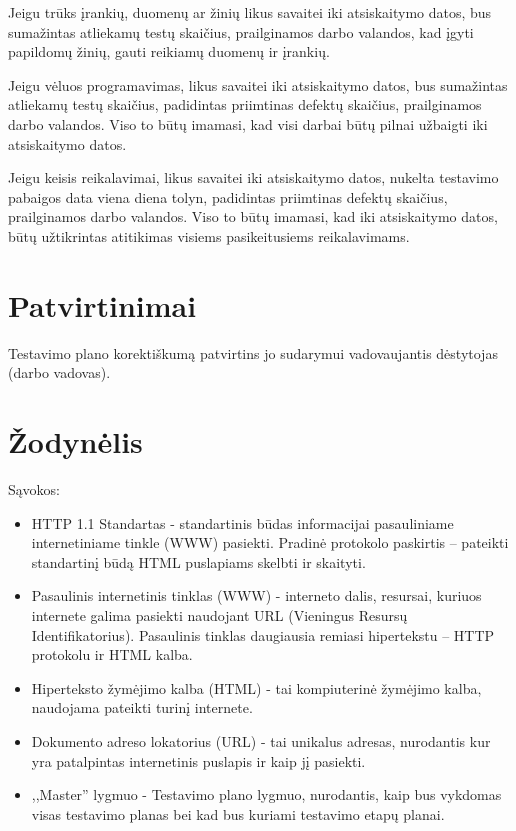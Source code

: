 Jeigu trūks įrankių, duomenų ar žinių likus savaitei iki atsiskaitymo datos, bus sumažintas atliekamų testų skaičius, prailginamos darbo valandos, kad įgyti papildomų žinių, gauti reikiamų duomenų ir įrankių.

Jeigu vėluos programavimas, likus savaitei iki atsiskaitymo datos, bus sumažintas atliekamų testų skaičius, padidintas priimtinas defektų skaičius, prailginamos darbo valandos. Viso to būtų imamasi, kad visi darbai būtų pilnai užbaigti iki atsiskaitymo datos.

Jeigu keisis reikalavimai, likus savaitei iki atsiskaitymo datos, nukelta testavimo pabaigos data viena diena tolyn, padidintas priimtinas defektų skaičius, prailginamos darbo valandos. Viso to būtų imamasi, kad iki atsiskaitymo datos, būtų užtikrintas atitikimas visiems pasikeitusiems reikalavimams.

\section{Patvirtinimai}

Testavimo plano korektiškumą patvirtins jo sudarymui vadovaujantis dėstytojas (darbo vadovas).

\section{Žodynėlis}

Sąvokos:

\begin{itemize}
	\item HTTP 1.1 Standartas - standartinis būdas informacijai pasauliniame internetiniame tinkle (WWW) pasiekti. 
		  Pradinė protokolo paskirtis – pateikti standartinį būdą HTML puslapiams skelbti ir skaityti.
	\item Pasaulinis internetinis tinklas (WWW) - interneto dalis, resursai, kuriuos internete galima pasiekti naudojant URL (Vieningus Resursų Identifikatorius).
		  Pasaulinis tinklas daugiausia remiasi hipertekstu – HTTP protokolu ir HTML kalba.
	\item Hiperteksto žymėjimo kalba (HTML) - tai kompiuterinė žymėjimo kalba, naudojama pateikti turinį internete.
	\item Dokumento adreso lokatorius (URL) - tai unikalus adresas, nurodantis kur yra patalpintas internetinis puslapis ir kaip jį pasiekti.
	\item ,,Master'' lygmuo - Testavimo plano lygmuo, nurodantis, kaip bus vykdomas visas testavimo planas bei kad bus kuriami testavimo etapų planai.
	
\end{itemize}

